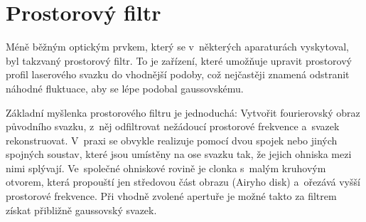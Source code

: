 \section{Prostorový filtr}
\label{sec:instruments-spatialfilter}
Méně běžným optickým prvkem, který se v~některých aparaturách vyskytoval,
byl takzvaný prostorový filtr.
To je zařízení, které umožňuje upravit prostorový profil laserového svazku
do vhodnější podoby, což nejčastěji znamená odstranit náhodné fluktuace,
aby se lépe podobal gaussovskému.

Základní myšlenka prostorového filtru je jednoduchá:
Vytvořit fourierovský obraz původního svazku,
z~něj odfiltrovat nežádoucí prostorové frekvence
a~svazek rekonstruovat.
V~praxi se obvykle realizuje pomocí dvou spojek nebo jiných spojných soustav,
které jsou umístěny na ose svazku tak, že jejich ohniska mezi nimi splývají.
Ve~společné ohniskové rovině je clonka s~malým kruhovým otvorem,
která propouští jen středovou část obrazu (Airyho disk)
a~ořezává vyšší prostorové frekvence.
Při vhodně zvolené apertuře je možné takto za filtrem získat přibližně
gaussovský svazek.
